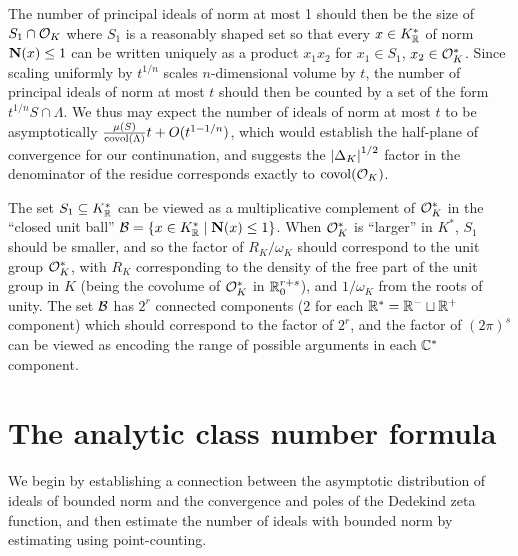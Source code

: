 \documentclass[11pt]{report}
\begin{document}
The number of principal ideals of norm at most 1 should then be the size of $S_1 \cap \mathcal{O}_K$ where $S_1$ is a reasonably shaped set so that every $x \in K_{\mathbb{R}}^*$ of norm $\operatorname{\mathbf{N}}(x) \leq 1$ can be written uniquely as a product $x_1x_2$ for $x_1 \in S_1$, $x_2 \in \mathcal{O}_K^*$. Since scaling uniformly by $t^{1/n}$ scales $n$-dimensional volume by $t$, the number of principal ideals of norm at most $t$ should then be counted by a set of the form $t^{1/n} S \cap \Lambda$. We thus may expect the number of ideals of norm at most $t$ to be asymptotically $\frac{\mu(S)}{\operatorname{covol}(\Lambda)}t + O(t^{1 - 1/n})$, which would establish the half-plane of convergence for our continunation, and suggests the $\left| \Delta_K \right|^{1/2}$ factor in the denominator of the residue corresponds exactly to $\operatorname{covol}(\mathcal{O}_K)$.

The set $S_1 \subseteq K_{\mathbb{R}}^*$ can be viewed as a multiplicative complement of $\mathcal{O}_K^*$ in the ``closed unit ball'' ${\mathcal{B} = \left\{  x \in K_{\mathbb{R}}^* \mid \operatorname{\mathbf{N}}(x) \leq 1  \right\}}$. When $\mathcal{O}_K^*$ is ``larger'' in $K^*$, $S_1$ should be smaller, and so the factor of $R_K/\omega_K$ should correspond to the unit group $\mathcal{O}_K^*$, with $R_K$ corresponding to the density of the free part of the unit group in $K$ (being the covolume of $\mathcal{O}_K^*$ in $\mathbb{R}_{0}^{r + s}$), and $1/\omega_K$ from the roots of unity. The set $\mathcal{B}$ has $2^r$ connected components ($2$ for each $\mathbb{R}^*  = \mathbb{R}^- \sqcup \mathbb{R}^+$ component) which should correspond to the factor of $2^r$, and the factor of $(2\pi)^s$ can be viewed as encoding the range of possible arguments in each $\mathbb{C}^*$ component.




\chapter{The analytic class number formula}
We begin by establishing a connection between the asymptotic distribution of ideals of bounded norm and the convergence and poles of the Dedekind zeta function, and then estimate the number of ideals with bounded norm by estimating using point-counting.
\end{document}
